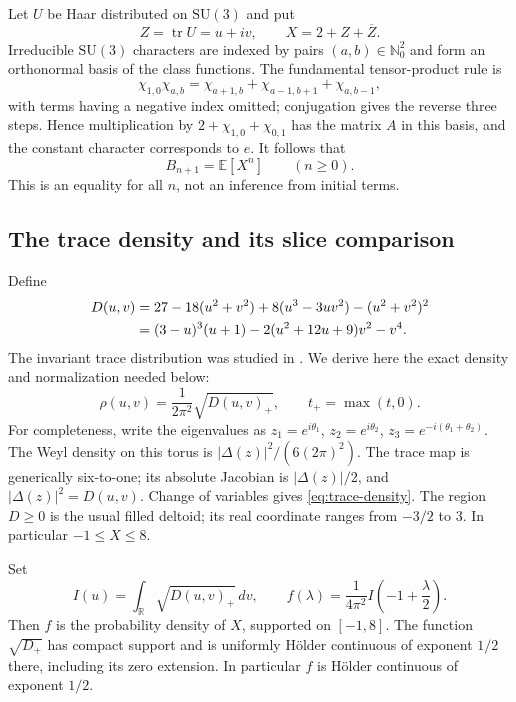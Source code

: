 \documentclass[11pt,a4paper]{article}
\theoremstyle{remark}\newtheorem{remark}[theorem]{Remark}
\numberwithin{equation}{section}
\begin{document}
Let $U$ be Haar distributed on $\mathrm{SU}(3)$ and put
\[
 Z=\operatorname{tr}U=u+iv,\qquad X=2+Z+\overline Z.
\]
Irreducible $\mathrm{SU}(3)$ characters are indexed by pairs
$(a,b)\in\mathbb N_0^2$ and form an orthonormal basis of the class
functions. The fundamental tensor-product rule is
\[
 \chi_{1,0}\chi_{a,b}
 =\chi_{a+1,b}+\chi_{a-1,b+1}+\chi_{a,b-1},
\]
with terms having a negative index omitted; conjugation gives the reverse
three steps. Hence multiplication by $2+\chi_{1,0}+\chi_{0,1}$ has the
matrix $A$ in this basis, and the constant character corresponds to $e$.
It follows that
\begin{equation}\label{eq:baxter-su3}
 B_{n+1}=\mathbb E[X^n]\qquad(n\ge0).
\end{equation}
This is an equality for all $n$, not an inference from initial terms.

\subsection{The trace density and its slice comparison}

Define
\begin{align}
 D(u,v)&=27-18(u^2+v^2)+8(u^3-3uv^2)-(u^2+v^2)^2\notag\\
 &= (3-u)^3(u+1)-2(u^2+12u+9)v^2-v^4.
 \label{eq:deltoid-D}
\end{align}
The invariant trace distribution was studied in \cite{GuralnikWarnockZemach1985}.
We derive here the exact density and normalization needed below:
\begin{equation}\label{eq:trace-density}
 \rho(u,v)=\frac1{2\pi^2}\sqrt{D(u,v)_+},\qquad t_+=\max(t,0).
\end{equation}
For completeness, write the eigenvalues as
$z_1=e^{i\theta_1}$, $z_2=e^{i\theta_2}$,
$z_3=e^{-i(\theta_1+\theta_2)}$. The Weyl density on this torus is
$|\Delta(z)|^2/(6(2\pi)^2)$. The trace map is generically six-to-one;
its absolute Jacobian is $|\Delta(z)|/2$, and
$|\Delta(z)|^2=D(u,v)$. Change of variables gives
\eqref{eq:trace-density}. The region $D\ge0$ is the usual filled deltoid;
its real coordinate ranges from $-3/2$ to $3$. In particular
$-1\le X\le8$.

Set
\[
 I(u)=\int_{\mathbb R}\sqrt{D(u,v)_+}\,dv,
 \qquad
 f(\lambda)=\frac1{4\pi^2}I\left(-1+\frac\lambda2\right).
\]
Then $f$ is the probability density of $X$, supported on $[-1,8]$.
The function $\sqrt{D_+}$ has compact support and is uniformly
H\"older continuous of exponent $1/2$ there, including its zero
extension. In particular $f$ is H\"older continuous of exponent $1/2$.
\end{document}
